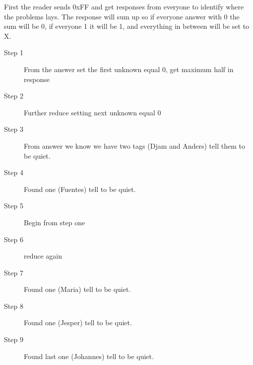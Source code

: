 First the reader sends 0xFF and get responses from everyone to identify where the problems lays. The response will sum up so if everyone answer with 0 the sum will be 0, if everyone 1 it will be 1, and everything in between will be set to X. \\

  \FloatBarrier
\begin{description}
 \item [Step 1] From the answer set the first unknown equal 0, get maximum half in response
 \item [Step 2] Further reduce setting next unknown equal 0
 \item [Step 3] From answer we know we have two tags (Djam and Anders) tell them to be quiet.
 \item [Step 4] Found one (Fuentes) tell to be quiet.
 \item [Step 5] Begin from step one 
 \item [Step 6] reduce again 
 \item [Step 7] Found one (Maria) tell to be quiet.
 \item [Step 8] Found one (Jesper) tell to be quiet.
 \item [Step 9] Found last one (Johannes) tell to be quiet.
\end{description}